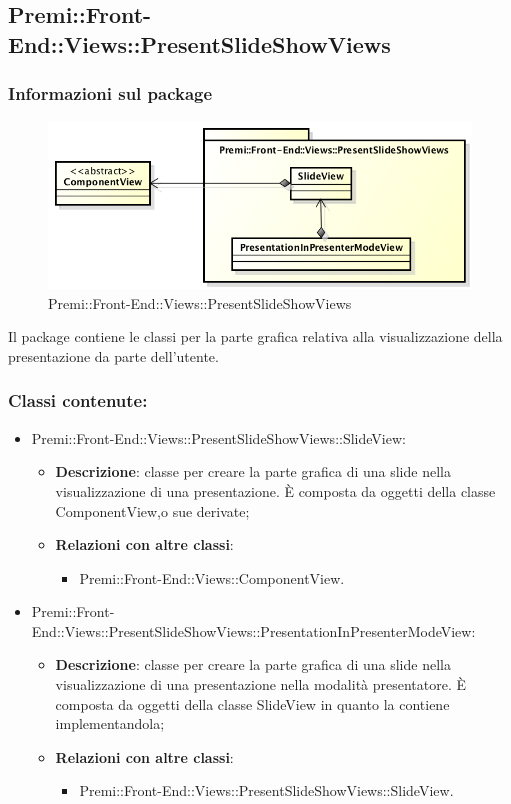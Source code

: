 	
\subsection{Premi::Front-End::Views::PresentSlideShowViews}
	\subsubsection*{Informazioni sul package}
	\begin{figure}[h]
		\centering
		\includegraphics[width=0.7\linewidth]{img/front-end_views_presentslideshowviews}
		\caption[Premi::Front-End::Views::PresentSlideShowViews]{Premi::Front-End::Views::PresentSlideShowViews}
	\end{figure}
	Il package contiene le classi per la parte grafica relativa alla visualizzazione della presentazione da parte dell'utente.
	
	\subsubsection*{Classi contenute:}
		\begin{itemize}
			\item Premi::Front-End::Views::PresentSlideShowViews::SlideView:
			\begin{itemize}
				\item \textbf{Descrizione}: classe per creare la parte grafica di una slide nella visualizzazione di una presentazione. È composta da oggetti della classe ComponentView,o sue derivate;
				\item \textbf{Relazioni con altre classi}:
				\begin{itemize}
					\item Premi::Front-End::Views::ComponentView.
				\end{itemize}
			\end{itemize}
			
			\item Premi::Front-End::Views::PresentSlideShowViews::PresentationInPresenterModeView:
			\begin{itemize}
				\item \textbf{Descrizione}: classe per creare la parte grafica di una slide nella visualizzazione di una presentazione nella modalità presentatore. È composta da oggetti della classe SlideView in quanto la contiene implementandola;
				\item \textbf{Relazioni con altre classi}:
				\begin{itemize}
					\item Premi::Front-End::Views::PresentSlideShowViews::SlideView.
				\end{itemize}
			\end{itemize}
		\end{itemize}
		
